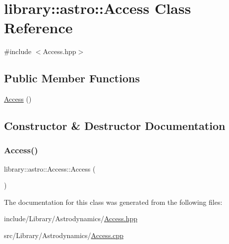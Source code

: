 \hypertarget{classlibrary_1_1astro_1_1_access}{}\section{library\+:\+:astro\+:\+:Access Class Reference}
\label{classlibrary_1_1astro_1_1_access}


{\ttfamily \#include $<$Access.\+hpp$>$}

\subsection*{Public Member Functions}
\begin{DoxyCompactItemize}
\item 
\hyperlink{classlibrary_1_1astro_1_1_access_aa5f6a5053e4f01d3dac79284d9ad69da}{Access} ()
\end{DoxyCompactItemize}


\subsection{Constructor \& Destructor Documentation}
\mbox{\label{classlibrary_1_1astro_1_1_access_aa5f6a5053e4f01d3dac79284d9ad69da}} 
\subsubsection{\texorpdfstring{Access()}{Access()}}
{\footnotesize\ttfamily library\+::astro\+::\+Access\+::\+Access (\begin{DoxyParamCaption}{ }\end{DoxyParamCaption})}



The documentation for this class was generated from the following files\+:\begin{DoxyCompactItemize}
\item 
include/\+Library/\+Astrodynamics/\hyperlink{_access_8hpp}{Access.\+hpp}\item 
src/\+Library/\+Astrodynamics/\hyperlink{_access_8cpp}{Access.\+cpp}\end{DoxyCompactItemize}
